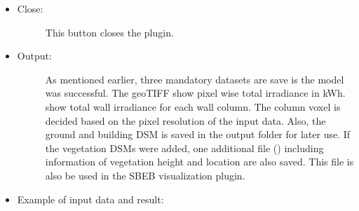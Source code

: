 \documentclass[letterpaper,10pt,english]{sphinxmanual}
\begin{document}
\begin{itemize}
\begin{description}
\end{description}

\item {} \begin{description}
\item[{Close:}] \leavevmode
This button closes the plugin.

\end{description}

\item {} \begin{description}
\item[{Output:}] \leavevmode
As mentioned earlier, three mandatory datasets are save is the model was successful. The geoTIFF  show pixel wise total irradiance in kWh.  show total wall irradiance for each wall column. The column voxel is decided based on the pixel resolution of the input data. Also, the ground and building DSM is saved in the output folder for later use. If the vegetation DSMs were added, one additional file () including information of vegetation height and location are also saved. This file is also be used in the SBEB visualization plugin.

\end{description}

\item {} 
Example of input data and result:

\end{itemize}
\end{document}
